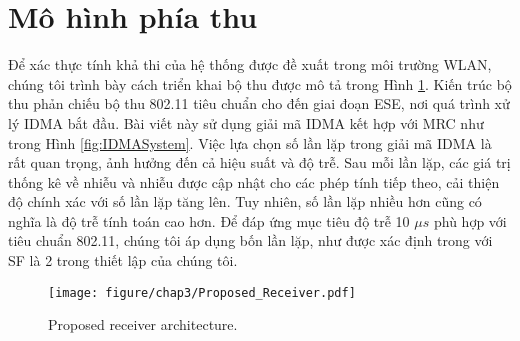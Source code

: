 \section{Mô hình phía thu}

Để xác thực tính khả thi của hệ thống được đề xuất trong môi trường WLAN, chúng tôi trình bày cách triển khai bộ thu được mô tả trong Hình \ref{fig:OFDMA-IDMARx}. Kiến trúc bộ thu phản chiếu bộ thu 802.11 tiêu chuẩn cho đến giai đoạn ESE, nơi quá trình xử lý IDMA bắt đầu. Bài viết này sử dụng giải mã IDMA kết hợp với MRC như trong Hình \ref{fig:IDMASystem}. Việc lựa chọn số lần lặp trong giải mã IDMA là rất quan trọng, ảnh hưởng đến cả hiệu suất và độ trễ. Sau mỗi lần lặp, các giá trị thống kê về nhiễu và nhiễu được cập nhật cho các phép tính tiếp theo, cải thiện độ chính xác với số lần lặp tăng lên. Tuy nhiên, số lần lặp nhiều hơn cũng có nghĩa là độ trễ tính toán cao hơn. Để đáp ứng mục tiêu độ trễ 10 $\mu s$ phù hợp với tiêu chuẩn 802.11, chúng tôi áp dụng bốn lần lặp, như được xác định trong \cite{UL-OFDM-IDMA} với SF là 2 trong thiết lập của chúng tôi.

\begin{figure}[H]
	\centering
	\texttt{[image: figure/chap3/Proposed\_Receiver.pdf]}
	\caption{Proposed receiver architecture.}
	\label{fig:OFDMA-IDMARx}
\end{figure}